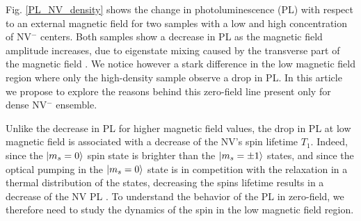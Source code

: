 \documentclass[preprintnumbers,amsmath,amssymb,superscriptaddress,twocolumn,showpacs]{revtex4-2}
\begin{document}
%

Fig. \ref{PL_NV_density} shows the change in photoluminescence (PL) with respect to an external magnetic field for two samples with a low and high concentration of NV$^-$ centers. Both samples show a decrease in PL as the magnetic field amplitude increases, due to eigenstate mixing caused by the transverse part of the magnetic field \citep{epstein2005anisotropic,lai2009influence}. We notice however a stark difference in the low magnetic field region where only the high-density sample observe a drop in PL. In this article we propose to explore the reasons behind this zero-field line present only for dense NV$^-$ ensemble.

Unlike the decrease in PL for higher magnetic field values, the drop in PL at low magnetic field is associated with a decrease of the NV's spin lifetime $T_1$. Indeed, since the $\ket{m_s=0}$ spin state is brighter than the $\ket{m_s=\pm 1}$ states, and since the optical pumping in the $\ket{m_s=0}$ state is in competition with the relaxation in a thermal distribution of the states, decreasing the spins lifetime results in a decrease of the NV PL \citep{finco2021imaging}. To understand the behavior of the PL in zero-field, we therefore need to study the dynamics of the spin in the low magnetic field region.
\end{document}
